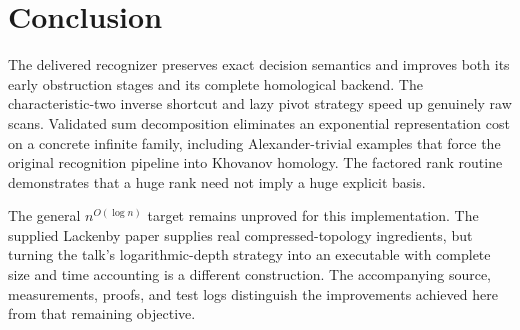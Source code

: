 \documentclass[11pt,a4paper]{article}
\theoremstyle{definition}\newtheorem{remark}[theorem]{Remark}
\begin{document}
\section{Conclusion}
The delivered recognizer preserves exact decision semantics and improves both
its early obstruction stages and its complete homological backend. The
characteristic-two inverse shortcut and lazy pivot strategy speed up genuinely
raw scans. Validated sum decomposition eliminates an exponential
representation cost on a concrete infinite family, including Alexander-trivial
examples that force the original recognition pipeline into Khovanov homology.
The factored rank routine demonstrates that a huge rank need not imply a huge
explicit basis.

The general $n^{O(\log n)}$ target remains unproved for this implementation.
The supplied Lackenby paper supplies real compressed-topology ingredients, but
turning the talk's logarithmic-depth strategy into an executable with complete
size and time accounting is a different construction. The accompanying source,
measurements, proofs, and test logs distinguish the improvements achieved here
from that remaining objective.
\end{document}
